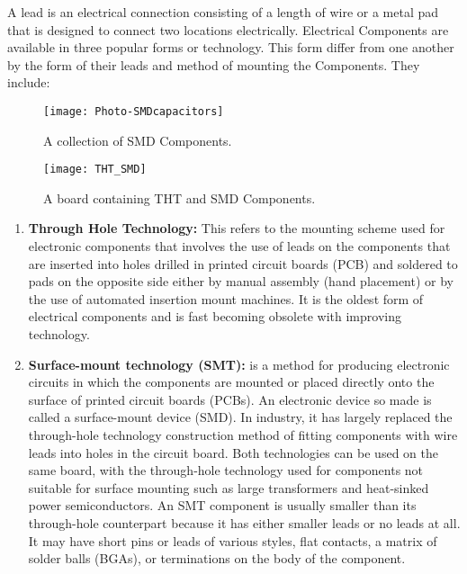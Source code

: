 A lead  is an electrical connection consisting of a length of wire or a metal pad that is designed to connect two locations electrically. Electrical Components are available in three popular forms or technology. This form differ from one another by the form of their leads and method of mounting the Components. They include:



\begin{figure}[p]
\texttt{[image: Photo-SMDcapacitors]}
\centering
\caption{A collection of SMD Components.}
\centering
\label{fig:smd1}


\end{figure}

\begin{figure}[p]

\texttt{[image: THT\_SMD]}
\centering
\caption{A board containing THT and SMD Components.}
\centering
\label{fig:THT_SMD}


\end{figure}
\begin{enumerate}
\item \textbf{Through Hole Technology:} This refers to the mounting scheme used for electronic components that involves the use of leads on the components that are inserted into holes drilled in printed circuit boards (PCB) and soldered to pads on the opposite side either by manual assembly (hand placement) or by the use of automated insertion mount machines. It is the oldest form of electrical components and is fast becoming obsolete with improving technology.
\item \textbf{Surface-mount technology (SMT):} is a method for producing electronic circuits in which the components are mounted or placed directly onto the surface of printed circuit boards (PCBs). An electronic device so made is called a surface-mount device (SMD). In industry, it has largely replaced the through-hole technology construction method of fitting components with wire leads into holes in the circuit board. Both technologies can be used on the same board, with the through-hole technology used for components not suitable for surface mounting such as large transformers and heat-sinked power semiconductors. An SMT component is usually smaller than its through-hole counterpart because it has either smaller leads or no leads at all. It may have short pins or leads of various styles, flat contacts, a matrix of solder balls (BGAs), or terminations on the body of the component. 
\end{enumerate}
